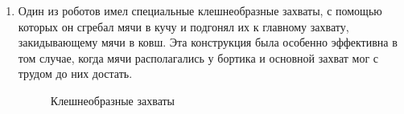 \begin{enumerate}
\begin{enumerate}
		\item Один из роботов имел специальные клешнеобразные захваты, с помощью которых он сгребал мячи в кучу и подгонял их к главному захвату, закидывающему мячи в ковш. Эта конструкция была особенно эффективна в том случае, когда мячи располагались у бортика и основной захват мог с трудом до них достать.
		\begin{figure}[H]
			\begin{minipage}[h]{0.47\linewidth}
			\end{minipage}
			\hfill
			\begin{minipage}[h]{0.47\linewidth}
			\end{minipage}
			\caption{Клешнеобразные захваты}
		\end{figure}
		

\end{enumerate}
\end{enumerate}
